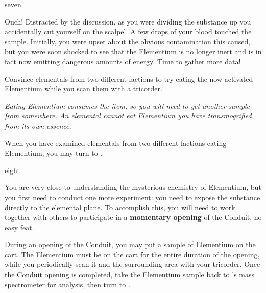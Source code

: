 \documentclass[notebook]{elementals}
\begin{document}
\begin{page}{seven}

Ouch! Distracted by the discussion, as you were dividing the substance up you accidentally cut yourself on the scalpel. A few drops of your blood touched the sample. Initially, you were upset about the obvious contamination this caused, but you were soon shocked to see that the Elementium is no longer inert and is in fact now emitting dangerous amounts of energy. Time to gather more data!

Convince elementals from two different factions to try eating the now-activated Elementium while you scan them with a tricorder.

\emph{Eating Elementium consumes the item, so you will need to get another sample from somewhere. An elemental cannot eat Elementium you have transmogrified from its own essence.}

When you have examined elementals from two different factions eating Elementium, you may turn to .

\end{page}

\begin{page}{eight}

You are very close to understanding the mysterious chemistry of Elementium, but you first need to conduct one more experiment: you need to expose the substance directly to the elemental plane. To accomplish this, you will need to work together with others to participate in a \textbf{momentary opening} of the Conduit, no easy feat.

During an opening of the Conduit, you may put a sample of Elementium on the cart. The Elementium must be on the cart for the entire duration of the opening, while you periodically scan it and the surrounding area with your tricorder. Once the Conduit opening is completed, take the Elementium sample back to \cGD{}'s mass spectrometer for analysis, then turn to .

\end{page}
\end{document}
